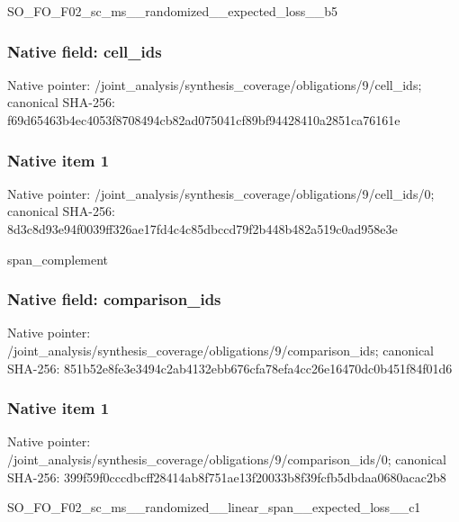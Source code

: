 \documentclass[10pt,a4paper]{article}
\begin{document}
\begingroup\raggedright\sloppy SO\_\allowbreak{}FO\_\allowbreak{}F02\_\allowbreak{}sc\_\allowbreak{}ms\_\allowbreak{}\_\allowbreak{}randomized\_\allowbreak{}\_\allowbreak{}expected\_\allowbreak{}loss\_\allowbreak{}\_\allowbreak{}b5\par\endgroup

\subsubsection{Native field: cell\_\allowbreak{}ids}
Native pointer: /joint\_\allowbreak{}analysis/synthesis\_\allowbreak{}coverage/obligations/9/cell\_\allowbreak{}ids; canonical SHA-256: f69d65463b4ec4053f8708494cb82ad075041cf89bf94428410a2851ca76161e

\subsubsection{Native item 1}
Native pointer: /joint\_\allowbreak{}analysis/synthesis\_\allowbreak{}coverage/obligations/9/cell\_\allowbreak{}ids/0; canonical SHA-256: 8d3c8d93e94f0039ff326ae17fd4c4c85dbccd79f2b448b482a519c0ad958e3e

\begingroup\raggedright\sloppy span\_\allowbreak{}complement\par\endgroup

\subsubsection{Native field: comparison\_\allowbreak{}ids}
Native pointer: /joint\_\allowbreak{}analysis/synthesis\_\allowbreak{}coverage/obligations/9/comparison\_\allowbreak{}ids; canonical SHA-256: 851b52e8fe3e3494c2ab4132ebb676cfa78efa4cc26e16470dc0b451f84f01d6

\subsubsection{Native item 1}
Native pointer: /joint\_\allowbreak{}analysis/synthesis\_\allowbreak{}coverage/obligations/9/comparison\_\allowbreak{}ids/0; canonical SHA-256: 399f59f0cccdbcff28414ab8f751ae13f20033b8f39fcfb5dbdaa0680acac2b8

\begingroup\raggedright\sloppy SO\_\allowbreak{}FO\_\allowbreak{}F02\_\allowbreak{}sc\_\allowbreak{}ms\_\allowbreak{}\_\allowbreak{}randomized\_\allowbreak{}\_\allowbreak{}linear\_\allowbreak{}span\_\allowbreak{}\_\allowbreak{}expected\_\allowbreak{}loss\_\allowbreak{}\_\allowbreak{}c1\par\endgroup
\end{document}
